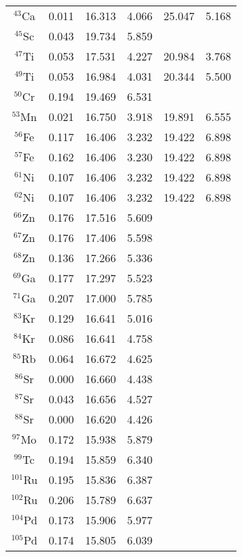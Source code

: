 \documentclass[twocolumn,showpacs,superscriptaddress,amsmath,amssymb,prc,preprintnumbers]{revtex4-1}
\begin{document}
\begin{center}
\begin{longtable}{c@{\extracolsep{\fill}}ccccc}
        $^{43}$Ca & 0.011  & 16.313  & 4.066  & 25.047  & 5.168  \\
        $^{45}$Sc & 0.043  & 19.734  & 5.859  &  &  \\
        $^{47}$Ti & 0.053  & 17.531  & 4.227  & 20.984  & 3.768  \\
        $^{49}$Ti & 0.053  & 16.984  & 4.031  & 20.344  & 5.500  \\
        $^{50}$Cr & 0.194  & 19.469  & 6.531  &  &  \\
        $^{53}$Mn & 0.021  & 16.750  & 3.918  & 19.891  & 6.555  \\
        $^{56}$Fe & 0.117  & 16.406  & 3.232  & 19.422  & 6.898  \\
        $^{57}$Fe & 0.162  & 16.406  & 3.230  & 19.422  & 6.898  \\
        $^{61}$Ni & 0.107  & 16.406  & 3.232  & 19.422  & 6.898  \\
        $^{62}$Ni & 0.107  & 16.406  & 3.232  & 19.422  & 6.898  \\
        $^{66}$Zn & 0.176  & 17.516  & 5.609  &  &  \\
        $^{67}$Zn & 0.176  & 17.406  & 5.598  &  &  \\
        $^{68}$Zn & 0.136  & 17.266  & 5.336  &  &  \\
        $^{69}$Ga & 0.177  & 17.297  & 5.523  &  &  \\
        $^{71}$Ga & 0.207  & 17.000  & 5.785  &  &  \\
        $^{83}$Kr & 0.129  & 16.641  & 5.016  &  &  \\
        $^{84}$Kr & 0.086  & 16.641  & 4.758  &  &  \\
        $^{85}$Rb & 0.064  & 16.672  & 4.625  &  &  \\
        $^{86}$Sr & 0.000 &  16.660 & 4.438  &  &  \\
        $^{87}$Sr & 0.043  & 16.656  & 4.527  &  &  \\
        $^{88}$Sr & 0.000 & 16.620 & 4.426  &  &  \\
        $^{97}$Mo & 0.172  & 15.938  & 5.879  &  &  \\
        $^{99}$Tc & 0.194  & 15.859  & 6.340  &  &  \\
        $^{101}$Ru & 0.195  & 15.836  & 6.387  &  &  \\
        $^{102}$Ru & 0.206  & 15.789  & 6.637  &  &  \\
        $^{104}$Pd & 0.173  & 15.906  & 5.977  &  &  \\
        $^{105}$Pd & 0.174  & 15.805  & 6.039  &  &  \\

\end{longtable}
\end{center}
\end{document}
